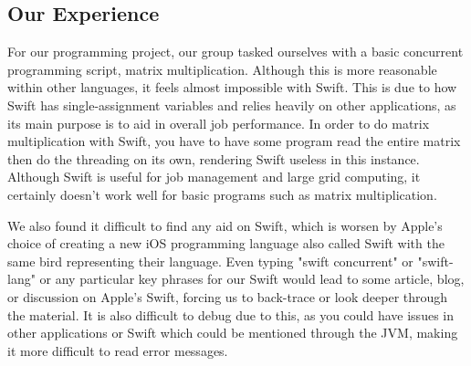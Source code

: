 \subsection{Our Experience}

    For our programming project, our group tasked ourselves with a basic concurrent programming script, matrix multiplication. Although this is more reasonable within other languages, it feels almost impossible with Swift. This is due to how Swift has single-assignment variables and relies heavily on other applications, as its main purpose is to aid in overall job performance. In order to do matrix multiplication with Swift, you have to have some program read the entire matrix then do the threading on its own, rendering Swift useless in this instance. Although Swift is useful for job management and large grid computing, it certainly doesn't work well for basic programs such as matrix multiplication.

    We also found it difficult to find any aid on Swift, which is worsen by Apple's choice of creating a new iOS programming language also called Swift with the same bird representing their language. Even typing "swift concurrent" or "swift-lang" or any particular key phrases for our Swift would lead to some article, blog, or discussion on Apple's Swift, forcing us to back-trace or look deeper through the material. It is also difficult to debug due to this, as you could have issues in other applications or Swift which could be mentioned through the JVM, making it more difficult to read error messages.
